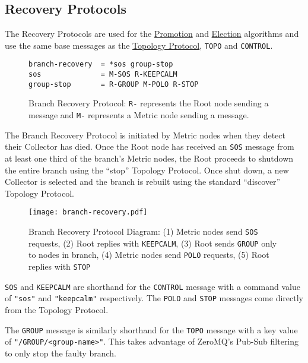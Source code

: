 \subsection{Recovery Protocols}
\label{proto_reco}

The \dcamp Recovery Protocols are used for the \hyperref[algor_promo]{Promotion} and \hyperref[algor_elect]{Election}
algorithms and use the same base messages as the \hyperref[proto_topo]{Topology Protocol}, \texttt{TOPO} and
\texttt{CONTROL}.

\begin{figure}[H]
\vspace{+10pt}
\begin{verbatim}
branch-recovery  = *sos group-stop
sos              = M-SOS R-KEEPCALM
group-stop       = R-GROUP M-POLO R-STOP
\end{verbatim}
\vspace{-5pt}
\caption[Branch Recovery Protocol]
	{Branch Recovery Protocol: \texttt{R-} represents the Root node sending a message and \texttt{M-} represents a
	 Metric node sending a message.}
\label{fig:proto_reco_branch_spec}
\end{figure}

The Branch Recovery Protocol is initiated by Metric nodes when they detect their Collector has died. Once the Root node
has received an \texttt{SOS} message from at least one third of the branch's Metric nodes, the Root proceeds to shutdown
the entire branch using the ``stop'' Topology Protocol. Once shut down, a new Collector is selected and the branch is
rebuilt using the standard ``discover'' Topology Protocol.

\begin{figure}[H]
    \centering
    \texttt{[image: branch-recovery.pdf]}
    \label{fig:proto_branch_reco_image}
    \caption[Branch Recovery Protocol Diagram]
            {Branch Recovery Protocol Diagram: (1) Metric nodes send \texttt{SOS} requests, (2) Root replies with
	     \texttt{KEEPCALM}, (3) Root sends \texttt{GROUP} only to nodes in branch, (4) Metric nodes send
	     \texttt{POLO} requests, (5) Root replies with \texttt{STOP}}
\end{figure}

\texttt{SOS} and \texttt{KEEPCALM} are shorthand for the \texttt{CONTROL} message with a command value of \texttt{"sos"}
and \texttt{"keepcalm"} respectively. The \texttt{POLO} and \texttt{STOP} messages come directly from the Topology
Protocol.

The \texttt{GROUP} message is similarly shorthand for the \texttt{TOPO} message with a key value of
\texttt{"/GROUP/<group-name>"}. This takes advantage of ZeroMQ's Pub-Sub filtering to only stop the faulty branch.

